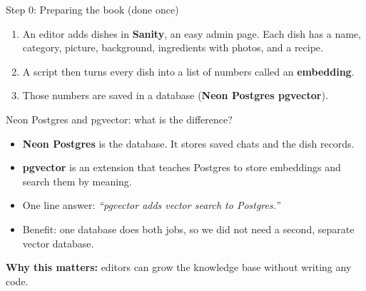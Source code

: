 \documentclass[aspectratio=169,11pt]{beamer}
\newcommand{\key}[1]{\textcolor{ember}{\textbf{#1}}}
\begin{document}
\begin{frame}{Step 0: Preparing the book (done once)}
  \begin{enumerate}
    \item An editor adds dishes in \key{Sanity}, an easy admin page. Each dish has a name, category, picture, background, ingredients with photos, and a recipe.
    \item A script then turns every dish into a list of numbers called an \key{embedding}.
    \item Those numbers are saved in a database (\key{Neon Postgres pgvector}).
  \end{enumerate}
  \vspace{0.2cm}
  \begin{block}{Neon Postgres and pgvector: what is the difference?}
    \small
    \begin{itemize}
      \item \key{Neon Postgres} is the \alert{database}. It stores saved chats and the dish records.
      \item \key{pgvector} is an \alert{extension} that teaches Postgres to store embeddings and search them by meaning.
      \item One line answer: \textit{``pgvector adds vector search to Postgres.''}
      \item Benefit: one database does both jobs, so we did not need a second, separate vector database.
    \end{itemize}
  \end{block}
  \vspace{0.1cm}
  {\small\textcolor{leaf}{\textbf{Why this matters:}} editors can grow the knowledge base without writing any code.}
\end{frame}
\end{document}
